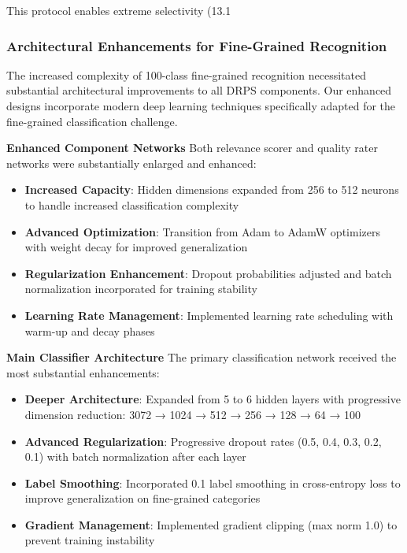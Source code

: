 \documentclass[12pt]{article}
\begin{document}
This protocol enables extreme selectivity (13.1%

\subsubsection{Architectural Enhancements for Fine-Grained Recognition}\label{architectural-enhancements}

The increased complexity of 100-class fine-grained recognition necessitated substantial architectural improvements to all DRPS components. Our enhanced designs incorporate modern deep learning techniques specifically adapted for the fine-grained classification challenge.

\textbf{Enhanced Component Networks}
Both relevance scorer and quality rater networks were substantially enlarged and enhanced:

\begin{itemize}
\item \textbf{Increased Capacity}: Hidden dimensions expanded from 256 to 512 neurons to handle increased classification complexity
\item \textbf{Advanced Optimization}: Transition from Adam to AdamW optimizers with weight decay for improved generalization
\item \textbf{Regularization Enhancement}: Dropout probabilities adjusted and batch normalization incorporated for training stability
\item \textbf{Learning Rate Management}: Implemented learning rate scheduling with warm-up and decay phases
\end{itemize}

\textbf{Main Classifier Architecture}
The primary classification network received the most substantial enhancements:

\begin{itemize}
\item \textbf{Deeper Architecture}: Expanded from 5 to 6 hidden layers with progressive dimension reduction: 3072 → 1024 → 512 → 256 → 128 → 64 → 100
\item \textbf{Advanced Regularization}: Progressive dropout rates (0.5, 0.4, 0.3, 0.2, 0.1) with batch normalization after each layer
\item \textbf{Label Smoothing}: Incorporated 0.1 label smoothing in cross-entropy loss to improve generalization on fine-grained categories
\item \textbf{Gradient Management}: Implemented gradient clipping (max norm 1.0) to prevent training instability
\end{itemize}
\end{document}
